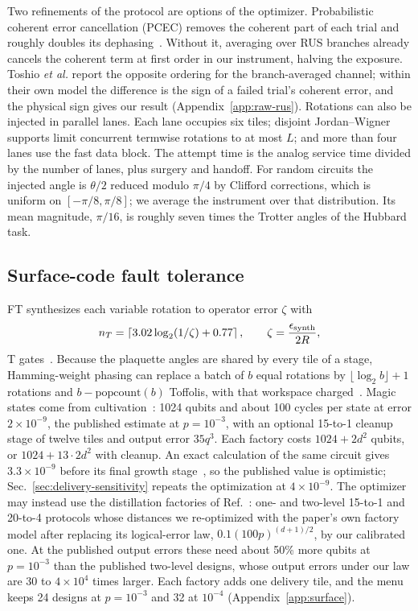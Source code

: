 \documentclass[11pt]{article}
\newcommand{\eps}{\epsilon}
\begin{document}
Two refinements of the protocol are options of the optimizer. Probabilistic
coherent error cancellation (PCEC) removes the coherent part of each trial and
roughly doubles its dephasing~\cite{toshio}. Without it, averaging over RUS
branches already cancels the coherent term at first order in our instrument,
halving the exposure. Toshio \textit{et al.} report the opposite ordering for
the branch-averaged channel; within their own model the difference is the sign
of a failed trial's coherent error, and the physical sign gives our result
(Appendix~\ref{app:raw-rus}). Rotations can also be injected in parallel
lanes. Each lane occupies six tiles; disjoint Jordan--Wigner supports limit
concurrent termwise rotations to at most $L$; and more than four lanes use the
fast data block. The attempt time is the analog service time divided by the
number of lanes, plus surgery and handoff. For random circuits the injected
angle is $\theta/2$ reduced modulo $\pi/4$ by Clifford corrections, which is
uniform on $[-\pi/8,\pi/8]$; we average the instrument over that distribution.
Its mean magnitude, $\pi/16$, is roughly seven times the Trotter angles of the
Hubbard task.

\subsection{Surface-code fault tolerance}\label{sec:ft}
FT synthesizes each variable rotation to operator error $\zeta$ with
\begin{equation}\label{eq:synthesis}
 n_T=\left\lceil3.02\log_2(1/\zeta)+0.77\right\rceil,\qquad
 \zeta=\frac{\eps_{\rm synth}}{2R},
\end{equation}
T gates~\cite{ross}. Because the plaquette angles are shared by every tile of
a stage, Hamming-weight phasing can replace a batch of $b$ equal rotations by
$\lfloor\log_2b\rfloor+1$ rotations and $b-\mathrm{popcount}(b)$ Toffolis,
with that workspace charged~\cite{campbell}. Magic states come from
cultivation~\cite{gidney2024cultivation}: 1024 qubits and about 100 cycles per
state at error $2\times10^{-9}$, the published estimate at $p=10^{-3}$, with an optional 15-to-1 cleanup stage of
twelve tiles and output error $35q^3$. Each factory costs $1024+2d^2$ qubits,
or $1024+13\cdot2d^2$ with cleanup. An exact calculation of the same circuit
gives $3.3\times10^{-9}$ before its final growth stage~\cite{wan2026exact}, so
the published value is optimistic; Sec.~\ref{sec:delivery-sensitivity} repeats
the optimization at $4\times10^{-9}$. The optimizer may instead use the
distillation factories of Ref.~\cite{litinski2019magic}: one- and two-level
15-to-1 and 20-to-4 protocols whose distances we re-optimized with the paper's
own factory model after replacing its logical-error law, $0.1(100p)^{(d+1)/2}$,
by our calibrated one. At the published output errors these need about 50\%
more qubits at $p=10^{-3}$ than the published two-level designs, whose output
errors under our law are 30 to $4\times10^4$ times larger. Each factory adds one
delivery tile, and the menu keeps 24 designs at $p=10^{-3}$ and 32 at $10^{-4}$
(Appendix~\ref{app:surface}).
\end{document}
